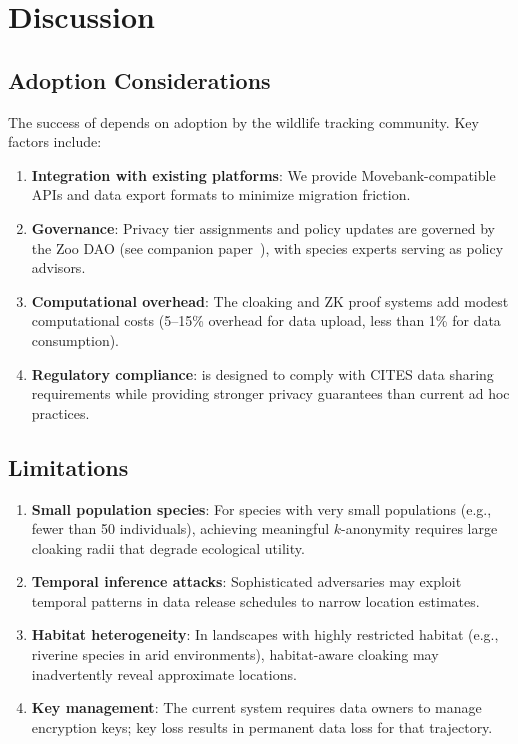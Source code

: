 \section{Discussion}


\subsection{Adoption Considerations}

The success of \WildTrack{} depends on adoption by the wildlife tracking community. Key factors include:

\begin{enumerate}[leftmargin=*]
    \item \textbf{Integration with existing platforms}: We provide Movebank-compatible APIs and data export formats to minimize migration friction.
    \item \textbf{Governance}: Privacy tier assignments and policy updates are governed by the Zoo DAO (see companion paper~\cite{zoo2026dao}), with species experts serving as policy advisors.
    \item \textbf{Computational overhead}: The cloaking and ZK proof systems add modest computational costs (5--15\% overhead for data upload, less than 1\% for data consumption).
    \item \textbf{Regulatory compliance}: \WildTrack{} is designed to comply with CITES data sharing requirements while providing stronger privacy guarantees than current ad hoc practices.
\end{enumerate}

\subsection{Limitations}

\begin{enumerate}[leftmargin=*]
    \item \textbf{Small population species}: For species with very small populations (e.g., fewer than 50 individuals), achieving meaningful $k$-anonymity requires large cloaking radii that degrade ecological utility.
    \item \textbf{Temporal inference attacks}: Sophisticated adversaries may exploit temporal patterns in data release schedules to narrow location estimates.
    \item \textbf{Habitat heterogeneity}: In landscapes with highly restricted habitat (e.g., riverine species in arid environments), habitat-aware cloaking may inadvertently reveal approximate locations.
    \item \textbf{Key management}: The current system requires data owners to manage encryption keys; key loss results in permanent data loss for that trajectory.
\end{enumerate}

